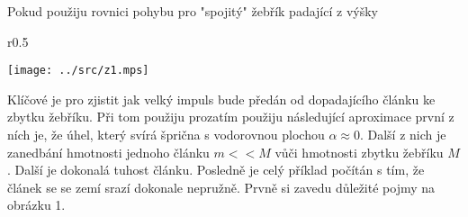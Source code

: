 \documentclass[11p, a4paper]{article}
\begin{document}
Pokud použiju rovnici pohybu pro "spojitý" žebřík padající z výšky
\begin{wrapfigure}{r}{0.5\textwidth}
      \vspace{-20pt}
      \begin{center}
      \texttt{[image: ../src/z1.mps]}
      \end{center}
      \vspace{-20pt}
\end{wrapfigure}
Klíčové je pro zjistit jak velký impuls bude předán od dopadajícího článku ke
zbytku žebříku. Při tom použiju prozatím použiju následující aproximace první
z ních je, že úhel, který svírá šprična s vodorovnou plochou $\alpha\approx0$.
Další z nich je zanedbání hmotnosti jednoho článku $m<<M$ vůči hmotnosti zbytku
žebříku $M$. Další je dokonalá tuhost článku. Posledně je celý příklad počítán
s tím, že článek se se zemí srazí dokonale nepružně. Prvně si zavedu důležité
pojmy na obrázku 1.

\end{document}
